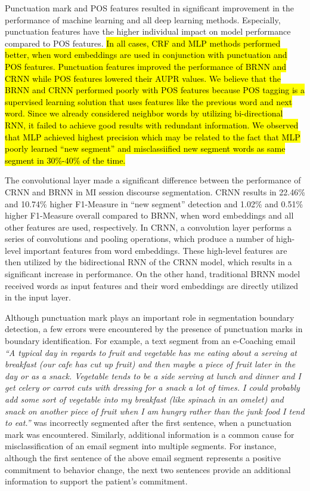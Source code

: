 \documentclass{amia}
\begin{document}
Punctuation mark and POS features resulted in significant improvement in the performance of machine learning and all deep learning methods. Especially, punctuation features have the higher individual impact on model performance compared to POS features. \hl{In all cases, CRF and MLP methods performed better, when word embeddings are used in conjunction with punctuation and POS features. Punctuation features improved the performance of BRNN and CRNN while POS features lowered their AUPR values. We believe that the BRNN and CRNN performed poorly with POS features because POS tagging is a supervised learning solution that uses features like the previous word and next word. Since we already considered neighbor words by utilizing bi-directional RNN, it failed to achieve good results with redundant information. We observed that MLP achieved highest precision which may be related to the fact that MLP poorly learned ``new segment'' and misclassiified new segment words as same segment in 30\%-40\% of the time.}

The convolutional layer made a significant difference between the performance of CRNN and BRNN in MI session discourse segmentation. CRNN results in 22.46\% and 10.74\% higher F1-Measure in ``new segment'' detection and 1.02\% and 0.51\% higher F1-Measure overall compared to BRNN, when word embeddings and all other features are used, respectively. In CRNN, a convolution layer performs a series of convolutions and pooling operations, which produce a number of high-level important features from word embeddings. These high-level features are then utilized by the bidirectional RNN of the CRNN model, which results in a significant increase in performance. On the other hand, traditional BRNN model received words as input features and their word embeddings are directly utilized in the input layer.     

Although punctuation mark plays an important role in segmentation boundary detection, a few errors were encountered by the presence of punctuation marks in boundary identification. For example, a text segment from an e-Coaching email \textit{``A typical day in regards to fruit and vegetable has me eating about a serving at breakfast (our cafe has cut up fruit) and then maybe a piece of fruit later in the day or as a snack. Vegetable tends to be a side serving at lunch and dinner and I get celery or carrot cuts with dressing for a snack a lot of times. I could probably add some sort of vegetable into my breakfast (like spinach in an omelet) and snack on another piece of fruit when I am hungry rather than the junk food I tend to eat.''} was incorrectly segmented after the first sentence, when a punctuation mark was encountered. Similarly, additional information is a common cause for misclassification of an email segment into multiple segments. For instance, although the first sentence of the above email segment represents a positive commitment to behavior change, the next two sentences provide an additional information to support the patient's commitment. 
\end{document}
